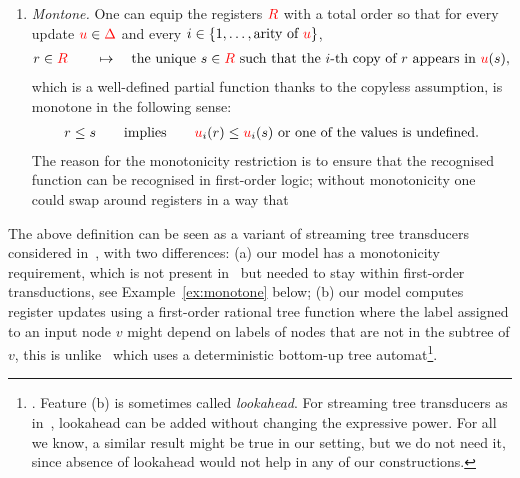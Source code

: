 \begin{definition}
\begin{itemize}
\begin{enumerate}
        \item \emph{Montone.} One can equip the registers ${{\color{red}{R}}}$ with a total order so that for every update ${\color{red}{u}} \in {\color{red}{\Delta}}$ and  every $i \in \{1,\ldots,\text{arity of ${\color{red}{u}}$}\}$,
        \begin{align*} 
            r \in {{\color{red}{R}}} \qquad \mapsto \quad \text{the unique $s \in {{\color{red}{R}}}$ such that the $i$-th copy of $r$ appears in ${\color{red}{u}}(s)$},
        \end{align*}
        which is a well-defined partial function thanks to the copyless assumption, is monotone in the following sense:
        \begin{align*}
            r \leq s \qquad \text{implies} \qquad  {\color{red}{u}}_i(r) \le  {\color{red}{u}}_i(s) \text{ or one of the values is undefined.}
        \end{align*}
        The reason for the monotonicity restriction is to ensure that the recognised function can be recognised in first-order logic; without monotonicity one could swap around registers in a way that 
    \end{enumerate}
    \end{itemize}
\end{definition}
The above definition can be seen as a variant of streaming tree transducers considered in~\cite{alur2017streaming}, with two differences: (a) our model has a monotonicity requirement, which is not present in~\cite{alur2017streaming} but needed to stay within first-order transductions, see Example~\ref{ex:monotone} below; (b)  our model  computes register updates using  a first-order rational tree function where the  label assigned to an input node $v$ might depend on labels of nodes that are not in the subtree of $v$, this is unlike~\cite{alur2017streaming} which uses a deterministic bottom-up tree automat\footnote{. Feature (b) is sometimes called  \emph{lookahead}. For streaming tree transducers as in~\cite{alur2017streaming}, lookahead can be added without changing the expressive power. For all we know, a  similar result might be true in our setting, but we do not need it, since absence of lookahead would not help in any of our constructions.  }. 
 
